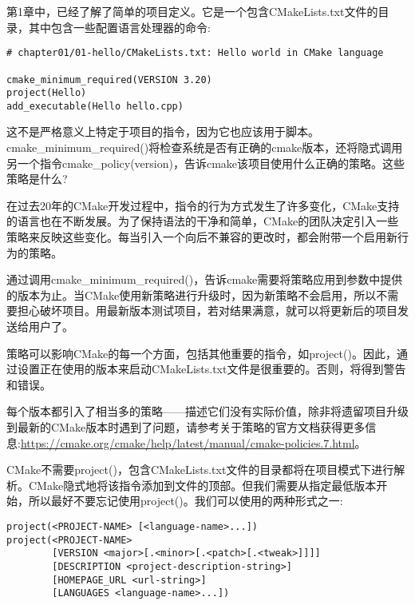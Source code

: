 
第1章中，已经了解了简单的项目定义。它是一个包含CMakeLists.txt文件的目录，其中包含一些配置语言处理器的命令:

\begin{lstlisting}[style=styleCMake]
# chapter01/01-hello/CMakeLists.txt: Hello world in CMake language

cmake_minimum_required(VERSION 3.20)
project(Hello)
add_executable(Hello hello.cpp)
\end{lstlisting}


这不是严格意义上特定于项目的指令，因为它也应该用于脚本。cmake\_minimum\_required()将检查系统是否有正确的cmake版本，还将隐式调用另一个指令cmake\_policy(version)，告诉cmake该项目使用什么正确的策略。这些策略是什么?

在过去20年的CMake开发过程中，指令的行为方式发生了许多变化，CMake支持的语言也在不断发展。为了保持语法的干净和简单，CMake的团队决定引入一些策略来反映这些变化。每当引入一个向后不兼容的更改时，都会附带一个启用新行为的策略。

通过调用cmake\_minimum\_required()，告诉cmake需要将策略应用到参数中提供的版本为止。当CMake使用新策略进行升级时，因为新策略不会启用，所以不需要担心破坏项目。用最新版本测试项目，若对结果满意，就可以将更新后的项目发送给用户了。

策略可以影响CMake的每一个方面，包括其他重要的指令，如project()。因此，通过设置正在使用的版本来启动CMakeLists.txt文件是很重要的。否则，将得到警告和错误。

每个版本都引入了相当多的策略——描述它们没有实际价值，除非将遗留项目升级到最新的CMake版本时遇到了问题，请参考关于策略的官方文档获得更多信息:\url{https://cmake.org/cmake/help/latest/manual/cmake-policies.7.html}。


CMake不需要project()，包含CMakeLists.txt文件的目录都将在项目模式下进行解析。CMake隐式地将该指令添加到文件的顶部。但我们需要从指定最低版本开始，所以最好不要忘记使用project()。我们可以使用的两种形式之一:

\begin{lstlisting}[style=styleCMake]
project(<PROJECT-NAME> [<language-name>...])
project(<PROJECT-NAME>
		[VERSION <major>[.<minor>[.<patch>[.<tweak>]]]]
		[DESCRIPTION <project-description-string>]
		[HOMEPAGE_URL <url-string>]
		[LANGUAGES <language-name>...])
\end{lstlisting}

